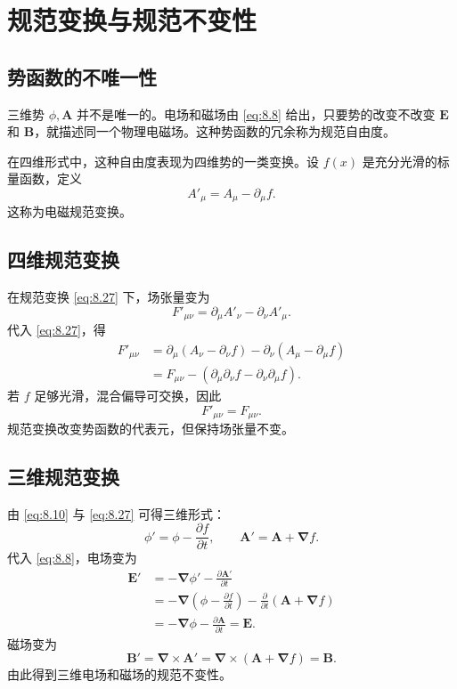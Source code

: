 \section{规范变换与规范不变性}

\subsection{势函数的不唯一性}

三维势 $\phi,\bm{A}$ 并不是唯一的。电场和磁场由 \eqref{eq:8.8} 给出，只要势的改变不改变 $\bm{E}$ 和 $\bm{B}$，就描述同一个物理电磁场。这种势函数的冗余称为规范自由度。

在四维形式中，这种自由度表现为四维势的一类变换。设 $f(x)$ 是充分光滑的标量函数，定义
\begin{equation}
	A'_{\mu}=A_{\mu}-\partial_{\mu}f.
	\label{eq:8.27}
\end{equation}
这称为电磁规范变换。

\subsection{四维规范变换}

在规范变换 \eqref{eq:8.27} 下，场张量变为
\[
F'_{\mu\nu}
=
\partial_{\mu}A'_{\nu}-\partial_{\nu}A'_{\mu}.
\]
代入 \eqref{eq:8.27}，得
\begin{align}
	F'_{\mu\nu}
	&=
	\partial_{\mu}(A_{\nu}-\partial_{\nu}f)
	-
	\partial_{\nu}(A_{\mu}-\partial_{\mu}f) \\
	&=
	F_{\mu\nu}
	-
	(\partial_{\mu}\partial_{\nu}f-
	\partial_{\nu}\partial_{\mu}f).
\end{align}
若 $f$ 足够光滑，混合偏导可交换，因此
\begin{equation}
	F'_{\mu\nu}=F_{\mu\nu}.
	\label{eq:8.29}
\end{equation}
规范变换改变势函数的代表元，但保持场张量不变。

\subsection{三维规范变换}

由 \eqref{eq:8.10} 与 \eqref{eq:8.27} 可得三维形式：
\begin{equation}
	\phi'=
	\phi-
	\frac{\partial f}{\partial t},
	\qquad
	\bm{A}'=
	\bm{A}+\bm{\nabla}f.
	\label{eq:8.30}
\end{equation}
代入 \eqref{eq:8.8}，电场变为
\begin{align}
	\bm{E}'
	&=
	-\bm{\nabla}\phi'
	-
	\frac{\partial\bm{A}'}{\partial t} \\
	&=
	-\bm{\nabla}\left(\phi-\frac{\partial f}{\partial t}\right)
	-
	\frac{\partial}{\partial t}(\bm{A}+\bm{\nabla}f) \\
	&=
	-\bm{\nabla}\phi
	-
	\frac{\partial\bm{A}}{\partial t}
	=
	\bm{E}.
\end{align}
磁场变为
\[
\bm{B}'
=
\bm{\nabla}\times\bm{A}'
=
\bm{\nabla}\times(\bm{A}+\bm{\nabla}f)
=
\bm{B}.
\]
由此得到三维电场和磁场的规范不变性。


